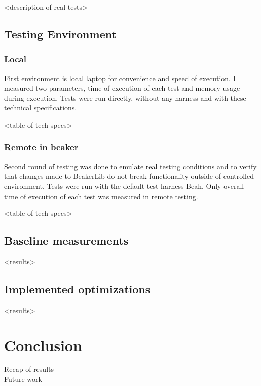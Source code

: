 <description of real tests>

\section{Testing Environment}

\subsection{Local}
First environment is local laptop for convenience and speed of execution. I measured  two parameters, time of execution of each test and memory usage during execution. Tests were run directly, without any harness and with these technical specifications. 

<table of tech specs>

\subsection{Remote in beaker}
Second round of testing was done to emulate real testing conditions and to verify that changes made to BeakerLib do not break functionality outside of controlled environment. Tests were run with the default test harness Beah. Only overall time of execution of each test was measured in remote testing.

<table of tech specs>

\section{Baseline measurements}
<results>


\section{Implemented optimizations}
<results>

\chapter{Conclusion}
Recap of results
\\
Future work


